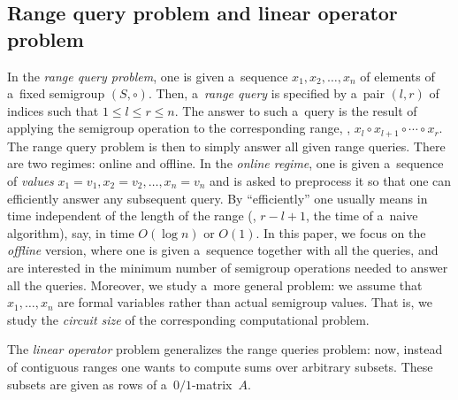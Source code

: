 \documentclass{toc}
\begin{document}



\subsection{Range query problem and linear operator problem}
In the \emph{range query problem},
one is given
a~sequence $x_1, x_2, \dotsc, x_n$ of
elements of a~fixed semigroup $(S, \circ)$.
Then, a~\emph{range query} is
specified by a~pair %
$(l,r)$ of indices  %
such that $1 \le l \le r \le n$.
The answer to such a~query is the result of applying the semigroup
operation to the
corresponding range, \ie, $x_l \circ x_{l+1} \circ \dotsb \circ x_r$.
The range query problem
is then to simply answer all given range
queries.
There are two
regimes: online and offline. In the \emph{online regime}, one is given
a~sequence of \emph{values}
$x_1=v_1, x_2=v_2, \dotsc, x_n=v_n$ and is asked to preprocess
it %
so that one can   %
efficiently answer  %
any subsequent query.
By ``efficiently'' one usually
means in time independent of the length of the range
(\ie, $r-l+1$, the time
of a~naive algorithm), say, in time $O(\log n)$ or $O(1)$.
In this paper, we
focus on the \emph{offline} version, where one is given a~sequence
together with
all the queries, and are interested in the minimum number of
semigroup
operations needed to answer all the queries. Moreover, we study
a~more general
problem: we assume that $x_1, \dotsc, x_n$ are formal variables
rather than
actual semigroup values. That is, we study the \emph{circuit size} of
the corresponding
computational problem.

The \emph{linear operator} problem generalizes the range
queries problem: now, instead of contiguous ranges one wants
to compute sums over arbitrary subsets. These subsets are
given as rows of a~$0/1$-matrix~$A$.  %
\end{document}
